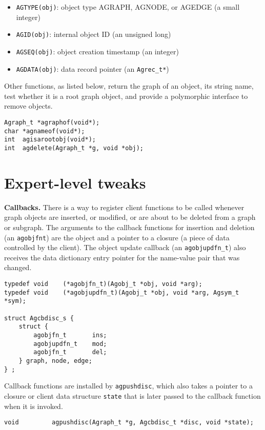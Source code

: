 \documentclass[11pt,letterpaper]{article}
\begin{document}
\begin{itemize}
\item \verb"AGTYPE(obj)":  object type AGRAPH, AGNODE, or AGEDGE
(a small integer)
\item \verb"AGID(obj)": internal object ID (an unsigned long)
\item \verb"AGSEQ(obj)": object creation timestamp (an integer)
\item \verb"AGDATA(obj)": data record pointer (an \verb"Agrec_t*")
\end{itemize}

Other functions, as listed below, return the graph of an object,
its string name, test whether it is a root graph object, and
provide a polymorphic interface to remove objects.
\begin{verbatim}
Agraph_t *agraphof(void*);
char *agnameof(void*);
int  agisarootobj(void*);
int  agdelete(Agraph_t *g, void *obj);
\end{verbatim}

\section{Expert-level tweaks}
\label{sec:expertleveltweaks}

{\bf Callbacks.}
There is a way to register client functions to be called
whenever graph objects are inserted, or modified, or are
about to be deleted from a graph or subgraph. 
The arguments to the callback functions for insertion and
deletion (an \verb"agobjfnt") are the object and a pointer
to a closure (a piece of data controlled by the client).
The object update callback (an \verb"agobjupdfn_t") also
receives the data dictionary entry pointer for the
name-value pair that was changed.

\begin{verbatim}
typedef void    (*agobjfn_t)(Agobj_t *obj, void *arg);
typedef void    (*agobjupdfn_t)(Agobj_t *obj, void *arg, Agsym_t *sym);

struct Agcbdisc_s {
    struct {
        agobjfn_t       ins;
        agobjupdfn_t    mod;
        agobjfn_t       del;
    } graph, node, edge;
} ;
\end{verbatim}

Callback functions are installed by \verb"agpushdisc", which also takes
a pointer to a closure or client data structure \verb"state" that is
later passed to the callback function when it is invoked.

\begin{verbatim}
void         agpushdisc(Agraph_t *g, Agcbdisc_t *disc, void *state);
\end{verbatim}
\end{document}

